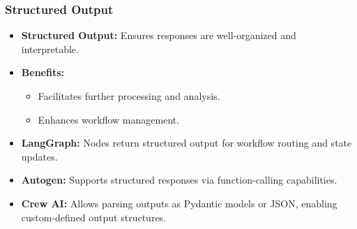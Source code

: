 \begin{frame}[fragile]\frametitle{Structured Output}
\begin{itemize}
    \item \textbf{Structured Output:} Ensures responses are well-organized and interpretable.
    \item \textbf{Benefits:}
    \begin{itemize}
        \item Facilitates further processing and analysis.
        \item Enhances workflow management.
    \end{itemize}
    \item \textbf{LangGraph:} Nodes return structured output for workflow routing and state updates.
    \item \textbf{Autogen:} Supports structured responses via function-calling capabilities.
    \item \textbf{Crew AI:} Allows parsing outputs as Pydantic models or JSON, enabling custom-defined output structures.
\end{itemize}
\end{frame}

